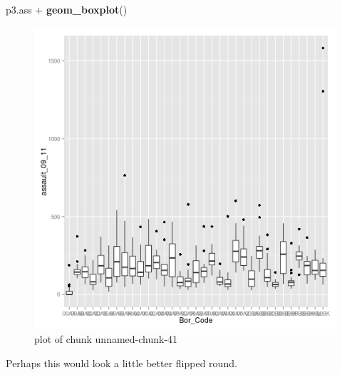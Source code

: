 \documentclass[]{article}
\makeatletter
\newenvironment{Shaded}{}{}
\newcommand{\KeywordTok}[1]{\textcolor[rgb]{0.00,0.44,0.13}{\textbf{{#1}}}}
\newcommand{\NormalTok}[1]{{#1}}
\def\maxwidth{\ifdim\Gin@nat@width>\linewidth\linewidth
\else\Gin@nat@width\fi}
\let\Oldincludegraphics\includegraphics
\renewcommand{\includegraphics}[1]{\Oldincludegraphics[width=\maxwidth]{#1}}
\makeatother
\begin{document}
\begin{Shaded}
\begin{Highlighting}[]
\NormalTok{p3.ass + }\KeywordTok{geom_boxplot}\NormalTok{()}
\end{Highlighting}
\end{Shaded}
\begin{figure}[htbp]
\centering
\includegraphics{figure/unnamed-chunk-41.png}
\caption{plot of chunk unnamed-chunk-41}
\end{figure}

Perhaps this would look a little better flipped round.
\end{document}
